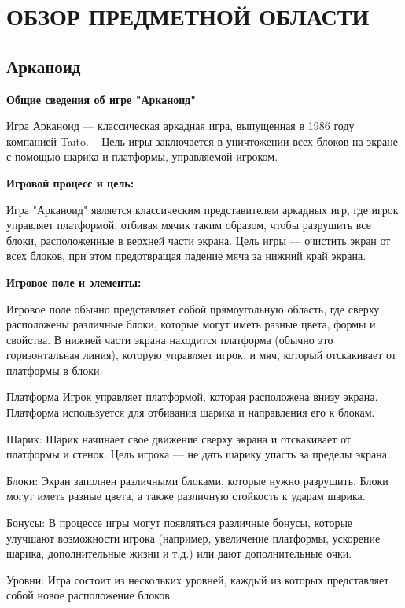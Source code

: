 \chapter{\label{ch:ch01}ОБЗОР ПРЕДМЕТНОЙ ОБЛАСТИ} %

\section{\label{sec:ch01/sec01} Арканоид}

\textbf{Общие сведения об игре "Арканоид"}

Игра Арканоид — классическая аркадная игра, выпущенная в 1986 году компанией Taito.
~\cite{wikiRUArkanoid} Цель игры заключается в уничтожении всех блоков на экране с помощью шарика и платформы, управляемой игроком. 

\textbf{Игровой процесс и цель:} ~\cite{wikiRUHabr7}

Игра "Арканоид" является классическим представителем аркадных игр, где игрок управляет платформой, отбивая мячик таким образом, чтобы разрушить все блоки, расположенные в верхней части экрана. Цель игры — очистить экран от всех блоков, при этом предотвращая падение мяча за нижний край экрана.

\textbf{Игровое поле и элементы:}

Игровое поле обычно представляет собой прямоугольную область, где сверху расположены различные блоки, которые могут иметь разные цвета, формы и свойства. В нижней части экрана находится платформа (обычно это горизонтальная линия), которую управляет игрок, и мяч, который отскакивает от платформы в блоки.

    Платформа Игрок управляет платформой, которая расположена внизу экрана. Платформа используется для отбивания шарика и направления его к блокам.

    Шарик: Шарик начинает своё движение сверху экрана и отскакивает от платформы и стенок. Цель игрока — не дать шарику упасть за пределы экрана.

    Блоки: Экран заполнен различными блоками, которые нужно разрушить. Блоки могут иметь разные цвета, а также различную стойкость к ударам шарика.

    Бонусы: В процессе игры могут появляться различные бонусы, которые улучшают возможности игрока (например, увеличение платформы, ускорение шарика, дополнительные жизни и т.д.) или дают дополнительные очки.

    Уровни: Игра состоит из нескольких уровней, каждый из которых представляет собой новое расположение блоков


